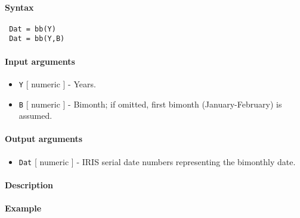 


	\paragraph{Syntax}
 
 \begin{verbatim}
 Dat = bb(Y)
 Dat = bb(Y,B)
 \end{verbatim}
 
 \paragraph{Input arguments}
 
 \begin{itemize}
 \item
   \texttt{Y} {[} numeric {]} - Years.
 \item
   \texttt{B} {[} numeric {]} - Bimonth; if omitted, first bimonth
   (January-February) is assumed.
 \end{itemize}
 
 \paragraph{Output arguments}
 
 \begin{itemize}
 \item
   \texttt{Dat} {[} numeric {]} - IRIS serial date numbers representing
   the bimonthly date.
 \end{itemize}
 
 \paragraph{Description}
 
 \paragraph{Example}


